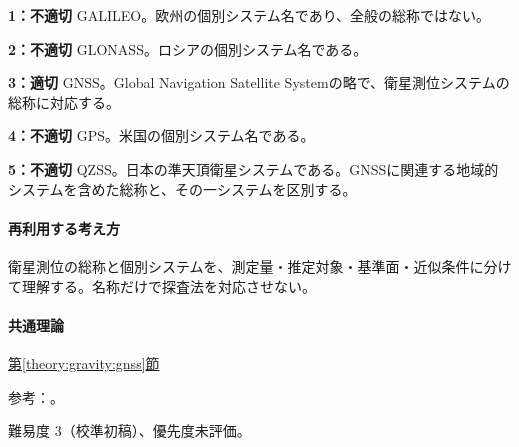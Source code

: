 \noindent\textbf{1：不適切} GALILEO。欧州の個別システム名であり、全般の総称ではない。\par

\noindent\textbf{2：不適切} GLONASS。ロシアの個別システム名である。\par

\noindent\textbf{3：適切} GNSS。Global Navigation Satellite Systemの略で、衛星測位システムの総称に対応する。\par

\noindent\textbf{4：不適切} GPS。米国の個別システム名である。\par

\noindent\textbf{5：不適切} QZSS。日本の準天頂衛星システムである。GNSSに関連する地域的システムを含めた総称と、その一システムを区別する。\par

\paragraph{再利用する考え方} 衛星測位の総称と個別システムを、測定量・推定対象・基準面・近似条件に分けて理解する。名称だけで探査法を対応させない。

\paragraph{共通理論} \hyperref[theory:gravity:gnss]{第\ref*{theory:gravity:gnss}節}

\par 参考：\cite{gsi_gnss}。

\par 難易度 3（校準初稿）、優先度未評価。
